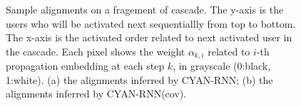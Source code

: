 \begin{figure}
\centering
{}
\caption{Sample alignments on a fragement of cascade. The y-axis is the users
who will be activated next sequentiallly from top to bottom. The x-axis is the
activated order related to next activated user in the cascade. Each pixel shows
the weight $\alpha_{k,i}$ related to $i$-th propagation embedding at each step
$k$, in grayscale (0:black, 1:white). (a) the alignments inferred by CYAN-RNN; (b) the
alignments inferred by CYAN-RNN(cov).
}
\end{figure}

